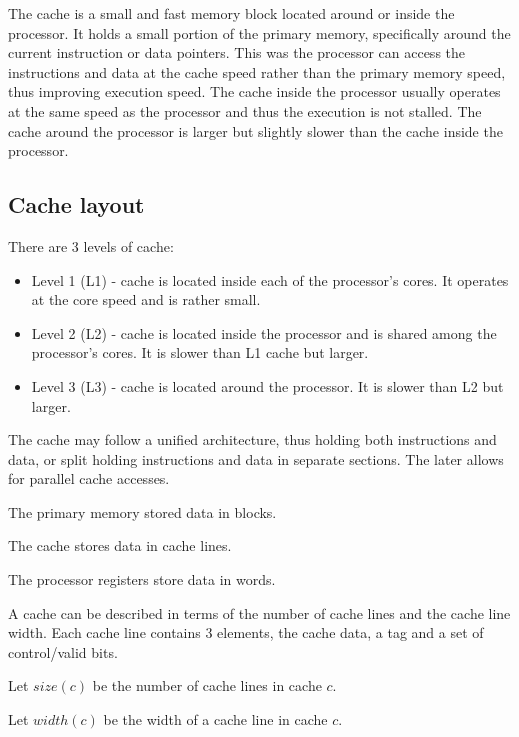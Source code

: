\documentclass{report}
\begin{document}
The cache is a small and fast memory block located around or inside the
processor. It holds a small portion of the primary memory, specifically around
the current instruction or data pointers. This was the processor can access
the instructions and data at the cache speed rather than the primary memory
speed, thus improving execution speed. The cache inside the processor usually
operates at the same speed as the processor and thus the execution is not
stalled. The cache around the processor is larger but slightly slower than the
cache inside the processor.

\subsection{Cache layout}

There are 3 levels of cache:

\begin{itemize}
    \item { Level 1 (L1) - cache is located inside each of the processor's cores. It
        operates at the core speed and is rather small.}

    \item { Level 2 (L2) - cache is located inside the processor and is shared among
        the processor's cores. It is slower than L1 cache but larger.}

    \item { Level 3 (L3) - cache is located around the processor. It is slower
        than L2 but larger.  }

\end{itemize}

The cache may follow a unified architecture, thus holding both instructions and
data, or split holding instructions and data in separate sections. The later
allows for parallel cache accesses.

The primary memory stored data in blocks.

The cache stores data in cache lines.

The processor registers store data in words.

A cache can be described in terms of the number of cache lines and the cache
line width. Each cache line contains 3 elements, the cache data, a tag and a set
of control/valid bits.

Let $size(c)$ be the number of cache lines in cache $c$.

Let $width(c)$ be the width of a cache line in cache $c$.
\end{document}

